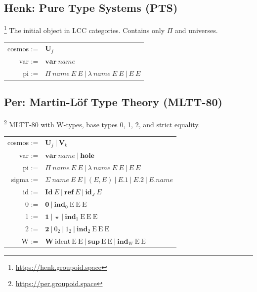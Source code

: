 \documentclass{article}
\theoremstyle{definition}
\theoremstyle{plain}
\begin{document}
\subsection{Henk: Pure Type Systems (PTS) \cite{Henk93}}\footnote{\url{https://henk.groupoid.space}}
The initial object in LCC categories. Contains only $\Pi$ and universes.
\begin{table}[ht!]
\centering
\begin{tabular}{rl}
 cosmos :=&$\textbf{U}_j$ \\
    var :=&$\textbf{var}\ name$ \\
     pi :=&$\Pi\ name\ E\ E\ |\ \lambda\ name\ E\ E\ |\ E\ E$ \\
\end{tabular}
\end{table}

\subsection{Per: Martin-L\"of Type Theory (MLTT-80) \cite{Lof84}}\footnote{\url{https://per.groupoid.space}}
MLTT-80 with W-types, base types 0, 1, 2, and strict equality.
\begin{table}[ht!]
\centering
\begin{tabular}{rl}
 cosmos :=&$\textbf{U}_j \ |\ \textbf{V}_k$ \\
    var :=&$\textbf{var}\ name\ |\ \textbf{hole}$ \\
     pi :=&$\Pi\ name\ E\ E\ |\ \lambda\ name\ E\ E\ |\ E\ E$ \\
  sigma :=&$\Sigma\ name\ E\ E\ |\ (E,E)\ |\ E.1\ |\ E.2\ |\ E.name$ \\
     id :=&$\textbf{Id}\ E\ |\ \textbf{ref}\ E\ |\ \textbf{id$_J$}\ E$ \\
      0 :=&$\textbf{0}\ |\ \textbf{ind$_0$}\ \textrm{E}\ \textrm{E}\ \textrm{E}$ \\
      1 :=&$\textbf{1}\ |\ \star\ |\ \textbf{ind$_1$}\ \textrm{E}\ \textrm{E}\ \textrm{E}$ \\
      2 :=&$\textbf{2}\ |\ 0_2\ |\ 1_2\ |\ \textbf{ind$_2$}\ \textrm{E}\ \textrm{E}\ \textrm{E}$ \\
      W :=&$\textbf{W}\ \textrm{ident}\ \textrm{E}\ \textrm{E}\ |\ \textbf{sup}\ \textrm{E}\ \textrm{E}\ |\ \textbf{ind$_W$}\ \textrm{E}\ \textrm{E}$ \\
\end{tabular}
\end{table}

\newpage
\end{document}
